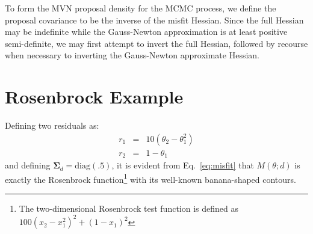 To form the MVN proposal density for the MCMC process, we define the
proposal covariance to be the inverse of the misfit Hessian.  Since
the full Hessian may be indefinite while the Gauss-Newton
approximation is at least positive semi-definite, we may first attempt
to invert the full Hessian, followed by recourse when necessary to
inverting the Gauss-Newton approximate Hessian.

\section{Rosenbrock Example} \label{uq:bayes:ex}

Defining two residuals as:
\begin{eqnarray}
r_1 &=& 10 (\theta_2 - \theta_1^2) \label{eq:rosen_r1} \\
r_2 &=& 1 - \theta_1 \label{eq:rosen_r2}
\end{eqnarray}
and defining $\boldsymbol{\Sigma}_d = \text{diag}(\boldsymbol{.5})$,
it is evident from Eq.~\ref{eq:misfit} that $M(\theta;d)$ is exactly
the Rosenbrock function\footnote{The two-dimensional Rosenbrock test
  function is defined as $100 (x_2 - x_1^2)^2 + (1 - x_1)^2$} with its
well-known banana-shaped contours.

